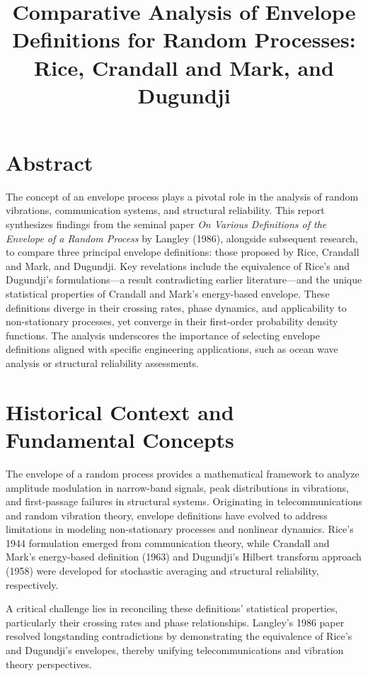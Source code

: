\documentclass[12pt]{article}
\title{Comparative Analysis of Envelope Definitions for Random Processes:\\ Rice, Crandall and Mark, and Dugundji}
\author{}
\date{}
\begin{document}
\maketitle

\section*{Abstract}
The concept of an envelope process plays a pivotal role in the analysis of random vibrations, communication systems, and structural reliability. This report synthesizes findings from the seminal paper \emph{On Various Definitions of the Envelope of a Random Process} by Langley (1986), alongside subsequent research, to compare three principal envelope definitions: those proposed by Rice, Crandall and Mark, and Dugundji. Key revelations include the equivalence of Rice’s and Dugundji’s formulations---a result contradicting earlier literature---and the unique statistical properties of Crandall and Mark’s energy-based envelope. These definitions diverge in their crossing rates, phase dynamics, and applicability to non-stationary processes, yet converge in their first-order probability density functions. The analysis underscores the importance of selecting envelope definitions aligned with specific engineering applications, such as ocean wave analysis or structural reliability assessments.

\section{Historical Context and Fundamental Concepts}
The envelope of a random process provides a mathematical framework to analyze amplitude modulation in narrow-band signals, peak distributions in vibrations, and first-passage failures in structural systems. Originating in telecommunications and random vibration theory, envelope definitions have evolved to address limitations in modeling non-stationary processes and nonlinear dynamics. Rice’s 1944 formulation emerged from communication theory, while Crandall and Mark’s energy-based definition (1963) and Dugundji’s Hilbert transform approach (1958) were developed for stochastic averaging and structural reliability, respectively.

A critical challenge lies in reconciling these definitions’ statistical properties, particularly their crossing rates and phase relationships. Langley’s 1986 paper resolved longstanding contradictions by demonstrating the equivalence of Rice’s and Dugundji’s envelopes, thereby unifying telecommunications and vibration theory perspectives.
\end{document}
